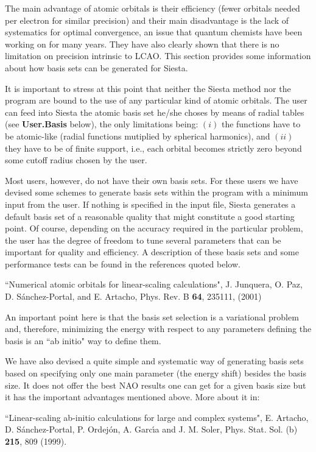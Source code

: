 \documentclass[11pt]{article}
\begin{document}
The main advantage of atomic orbitals is their efficiency (fewer orbitals
needed per electron for similar precision)
and their main disadvantage is the lack of systematics for optimal
convergence, an issue that quantum chemists have been working on for
many years. They have also clearly shown that there
is no limitation on precision intrinsic to LCAO.
This section provides some information about how basis sets can be
generated for {\sc Siesta}.

It is important to stress at this point that neither the {\sc Siesta}
method nor the program
are bound to the use of any particular kind of atomic orbitals. The
user can feed into {\sc Siesta} the atomic basis set he/she choses by
means of radial tables (see {\bf User.Basis} below), the
only limitations being: $(i)$ the functions have to be atomic-like (radial
functions mutiplied by spherical harmonics), and $(ii)$ they have to be
of finite support, i.e., each orbital becomes strictly zero beyond some
cutoff radius chosen by the user.

Most users, however, do not have their own basis sets. For these users
we have devised some schemes to generate basis sets within the program
with a minimum input from the user.  If nothing is specified in the
input file, Siesta generates a default basis set of a reasonable
quality that might constitute a good starting point.  Of course,
depending on the accuracy required in the particular problem, the user
has the degree of freedom to tune several parameters that can be
important for quality and efficiency. A description of these basis
sets and some performance tests can be found in the references quoted
below.

\noindent
``Numerical atomic orbitals for linear-scaling calculations",
J. Junquera, O. Paz, D. S\'anchez-Portal, and E. Artacho, Phys. Rev. B
{\bf 64}, 235111, (2001)

An important point here is that the basis set selection is a
variational problem and, therefore, minimizing the energy with respect
to any parameters defining the basis is an ``ab initio" way to
define them.

We have also devised a quite simple and systematic way of generating
basis sets based on specifying only one main parameter (the energy shift)
besides the basis size. It does not offer the best NAO results one can get
for a given basis size but it has the important advantages mentioned above.
More about it in:

\noindent
``Linear-scaling ab-initio calculations for large and complex systems",
E. Artacho, D. S\'anchez-Portal, P. Ordej\'on, A. Garc\'{\i}a and
J. M. Soler, Phys. Stat. Sol. (b) {\bf 215}, 809 (1999).
\end{document}
